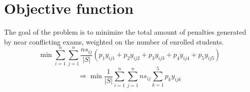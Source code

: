 \section*{Objective function}
The goal of the problem is to minimize the total amount of penalties generated by near conflicting exams, weighted on the number of enrolled students.
\[
\min{\sum_{i=1}^n \sum_{j=1}^n {\frac{ns_{ij}}{|S|} (p_{1} y_{ij1} + p_{2} y_{ij2} + p_{3} y_{ij3} + p_{4} y_{ij4} + p_{5} y_{ij5})}}
\]
\[
\Rightarrow \min{\frac{1}{|S|} \sum_{i=1}^n \sum_{j=1}^n {ns_{ij} \sum_ {k=1}^5 {p_{k} y_{ijk}}}}
\]